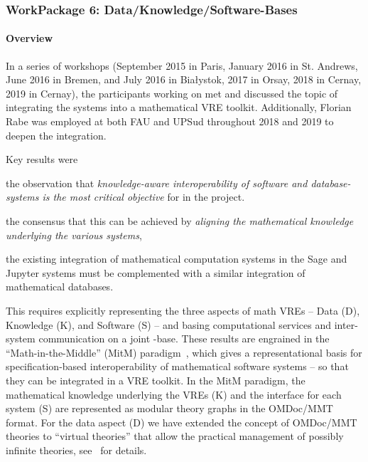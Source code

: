 \subsubsection{WorkPackage 6:  Data/Knowledge/Software-Bases}\label{dksbases}

\paragraph{Overview}

In a series of workshops (September 2015 in Paris, January 2016 in St. Andrews, June 2016 in Bremen, and July 2016 in Bia{\l}ystok, 2017 in Orsay, 2018 in Cernay, 2019 in Cernay), the participants working on  met and discussed the topic of integrating the \pn systems into a mathematical VRE toolkit.
Additionally, Florian Rabe was employed at both FAU and UPSud throughout 2018 and 2019 to deepen the integration.

Key results were
\begin{compactitem}[\bf R1.]
\item the observation that \emph{knowledge-aware interoperability of software and database-systems is the most critical objective} for  in the \pn project.
\item the consensus that this can be achieved by \emph{aligning the mathematical knowledge underlying the various systems},
\item the existing integration of mathematical computation systems in the Sage and Jupyter systems must be complemented with a similar integration of mathematical databases.
\end{compactitem}
This requires explicitly representing the three aspects of math VREs -- Data (D), Knowledge (K), and Software (S) -- and basing computational services and inter-system communication on a joint \DKS-base.
These results are engrained in the ``Math-in-the-Middle'' (MitM) paradigm~\cite{DehKohKon:iop16}, which gives a representational basis for specification-based interoperability of mathematical software systems -- so that they can be integrated in a VRE toolkit.
In the MitM paradigm, the mathematical knowledge underlying the VREs (K) and the interface for each system (S) are represented as modular theory graphs in the OMDoc/MMT format.
For the data aspect (D) we have extended the concept of OMDoc/MMT theories to ``virtual theories'' that allow the practical management of possibly infinite theories, see~\cite{ODK-D6.2} for details.

